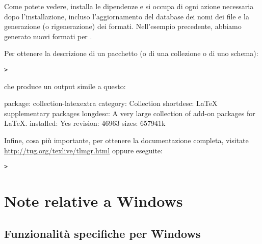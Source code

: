 \documentclass{article}
\begin{document}
Come potete vedere,  installa le dipendenze e si occupa di ogni
azione necessaria dopo l'installazione, incluso l'aggiornamento del
database dei nomi dei file e la generazione (o rigenerazione) dei formati.
Nell'esempio precedente, abbiamo generato nuovi formati per \XeTeX.

Per ottenere la descrizione di un pacchetto (o di una collezione o di uno
schema):
\begin{alltt}
> 
\end{alltt}
che produce un output simile a questo:
\begin{fverbatim}
package:    collection-latexextra
category:   Collection
shortdesc:  LaTeX supplementary packages
longdesc:   A very large collection of add-on packages for LaTeX.
installed:  Yes
revision:   46963
sizes:      657941k
\end{fverbatim}

Infine, cosa più importante, per ottenere la documentazione completa,
visitate \url{http://tug.org/texlive/tlmgr.html} oppure eseguite:
\begin{alltt}
> 
\end{alltt}


\section{Note relative a Windows}
\label{sec:windows}


\subsection{Funzionalità specifiche per Windows}
\label{sec:winfeatures}
\end{document}
